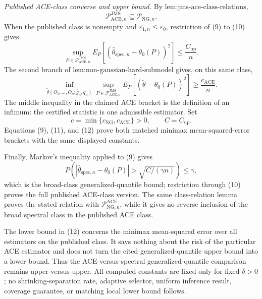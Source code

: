 \emph{Published ACE-class converse and upper bound.}  By \(\text{lem:jms-ace-class-relations}\),
\[
 \mathcal P_{\mathrm{ACE},n}^{\mathrm{JMS}}
 \subseteq\mathcal P_{\mathrm{NG},n}.
 \tag{10}
\]
When the published class is nonempty and \(\varepsilon_{1,n}\le\varepsilon_0\), restriction of (9) to (10) gives
\[
 \sup_{P\in\mathcal P_{\mathrm{ACE},n}^{\mathrm{JMS}}}
 E_P[(\widehat\theta_{\mathrm{spec},n}-\theta_0(P))^2]
 \le\frac{C_{\mathrm{up}}}{n}.
 \tag{11}
\]
The second branch of \(\text{lem:non-gaussian-hard-submodel}\) gives, on this same class,
\[
 \inf_{\widetilde\theta(O_1,\ldots,O_n;\bar g_n,\bar q_n)}
 \sup_{P\in\mathcal P_{\mathrm{ACE},n}^{\mathrm{JMS}}}
 E_P[(\widetilde\theta-\theta_0(P))^2]
 \ge\frac{c_{\mathrm{ACE}}}{n}.
 \tag{12}
\]
The middle inequality in the claimed ACE bracket is the definition of an infimum: the certified statistic is one admissible estimator.  Set
\[
 c=\min\{c_{\mathrm{NG}},c_{\mathrm{ACE}}\}>0,
 \qquad
 C=C_{\mathrm{up}}.
\]
Equations (9), (11), and (12) prove both matched minimax mean-squared-error brackets with the same displayed constants.

Finally, Markov's inequality applied to (9) gives
\[
 P\!\left(
 |\widehat\theta_{\mathrm{spec},n}-\theta_0(P)|
 >\sqrt{C/(\gamma n)}
 \right)\le\gamma,
\]
which is the broad-class generalized-quantile bound; restriction through (10) proves the full published ACE-class version.  The same class-relation lemma proves the stated relation with \(\mathcal P_{\mathrm{NG},n}^{\mathrm{ACE}}\), while it gives no reverse inclusion of the broad spectral class in the published ACE class.

The lower bound in (12) concerns the minimax mean-squared error over all estimators on the published class.  It says nothing about the risk of the particular ACE estimator and does not turn the cited generalized-quantile upper bound into a lower bound.  Thus the ACE-versus-spectral generalized-quantile comparison remains upper-versus-upper.  All computed constants are fixed only for fixed \(\delta>0\); no shrinking-separation rate, adaptive selector, uniform inference result, coverage guarantee, or matching local lower bound follows.